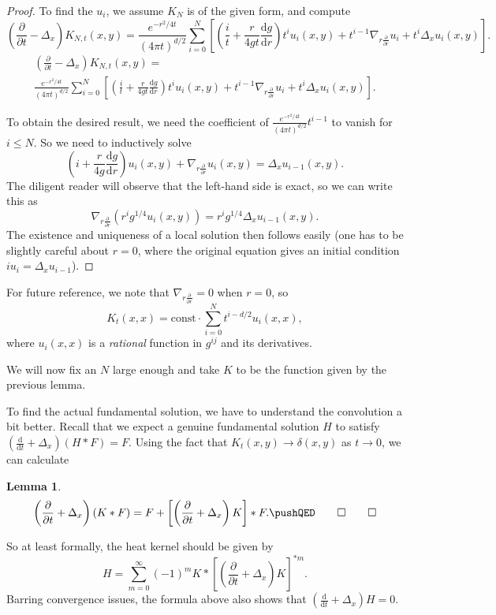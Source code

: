 \documentclass{shortart}
\newtheorem{lemma}[thm]{Lemma}
\theoremstyle{definition}
\renewcommand\d{\mathrm{d}}
\begin{document}
\begin{proof}
  To find the $u_i$, we assume $K_N$ is of the given form, and compute
  \ifplastex
    \[
      \left(\frac{\partial}{\partial t} - \Delta_x\right) K_{N, t}(x, y) = \frac{e^{-r^2/4t}}{(4\pi t)^{d/2}} \sum_{i = 0}^N \left[\left( \frac{i}{t} + \frac{r}{4gt} \frac{\d g}{\d r}\right) t^i u_i(x, y) + t^{i - 1} \nabla_{r \frac{\partial}{\partial r}} u_i + t^i \Delta_x u_i(x, y)\right].
    \]
  \else
    \begin{multline*}
      \left(\frac{\partial}{\partial t} - \Delta_x\right) K_{N, t}(x, y) =\\
      \frac{e^{-r^2/4t}}{(4\pi t)^{d/2}} \sum_{i = 0}^N \left[\left( \frac{i}{t} + \frac{r}{4gt} \frac{\d g}{\d r}\right) t^i u_i(x, y) + t^{i - 1} \nabla_{r \frac{\partial}{\partial r}} u_i + t^i \Delta_x u_i(x, y)\right].
    \end{multline*}
  \fi

  To obtain the desired result, we need the coefficient of $\frac{e^{-r^2/4t}}{(4\pi t)^{d/2}} t^{i - 1}$ to vanish for $i \leq N$. So we need to inductively solve
  \[
    \left(i + \frac{r}{4g} \frac{\d g}{\d r}\right) u_i(x, y) + \nabla_{r \frac{\partial}{\partial r}} u_i(x, y) = \Delta_x u_{i - 1}(x, y).
  \]
  The diligent reader will observe that the left-hand side is exact, so we can write this as
  \[
    \nabla_{r\frac{\partial}{\partial r}} \left(r^i g^{1/4} u_i(x, y)\right) = r^i g^{1/4} \Delta_x u_{i - 1}(x, y).
  \]
  The existence and uniqueness of a local solution then follows easily (one has to be slightly careful about $r = 0$, where the original equation gives an initial condition $i u_i = \Delta_x u_{i - 1}$).
\end{proof}
For future reference, we note that $\nabla_{r \frac{\partial}{\partial r}} = 0$ when $r = 0$, so
\[
  K_t(x, x) = \text{const} \cdot \sum_{i = 0}^N  t^{i - d/2} u_i(x, x),
\]
where $u_i(x, x)$ is a \emph{rational} function in $g^{ij}$ and its derivatives.

We will now fix an $N$ large enough and take $K$ to be the function given by the previous lemma.

To find the actual fundamental solution, we have to understand the convolution a bit better. Recall that we expect a genuine fundamental solution $H$ to satisfy $\left(\frac{\d}{\d t} + \Delta_x\right) (H * F) = F$. Using the fact that $K_t(x, y) \to \delta(x, y)$ as $t \to 0$, we can calculate
\begin{lemma}
  \[
    \left(\frac{\partial}{\partial t} + \Delta_x\right) (K * F) = F + \left[\left(\frac{\partial}{\partial t} + \Delta_x\right)K\right] * F.\fakeqed
  \]\ifplastex\fakeqed\fi
\end{lemma}
So at least formally, the heat kernel should be given by
\[
  H = \sum_{m = 0}^\infty (-1)^m K * \left[\left(\frac{\partial}{\partial t} + \Delta_x\right)K\right]^{*m}.
\]
Barring convergence issues, the formula above also shows that $\left(\frac{\d}{\d t} + \Delta_x\right) H = 0$.
\end{document}
